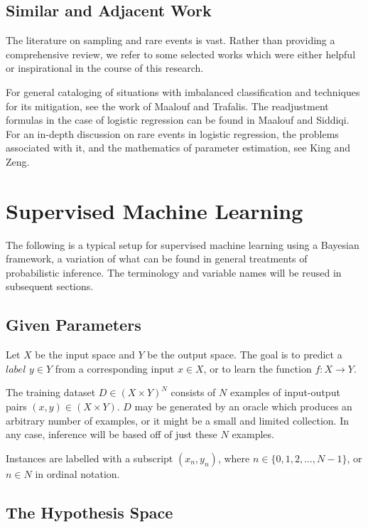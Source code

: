 \documentclass[twoside]{article}
\begin{document}
\subsection{Similar and Adjacent Work}

The literature on sampling and rare events is vast. Rather than providing a comprehensive review, we refer to some selected works which were either helpful or inspirational in the course of this research.

For general cataloging of situations with imbalanced classification and techniques for its mitigation, see the work of Maalouf and Trafalis\cite{rareevents}. The readjustment formulas in the case of logistic regression can be found in Maalouf and Siddiqi\cite{weightedlogistic}. For an in-depth discussion on rare events in logistic regression, the problems associated with it, and the mathematics of parameter estimation, see King and Zeng\cite{king}.

\section{Supervised Machine Learning} \label{framework}

The following is a typical setup for supervised machine learning using a Bayesian framework, a variation of what can be found in general treatments of probabilistic inference\cite{pythonbayes}\cite{gelmanbayes}\cite{blais}. The terminology and variable names will be reused in subsequent sections.

\subsection{Given Parameters}

Let \(X\) be the input space and \(Y\) be the output space. The goal is to predict a \(label\) \(y \in Y\) from a corresponding input \(x \in X\), or to learn the function \(f: X \to Y\).

The training dataset \(D \in (X \times Y)^N\) consists of \(N\) examples of input-output pairs \((x, y) \in (X \times Y) \). \(D\) may be generated by an oracle which produces an arbitrary number of examples, or it might be a small and limited collection. In any case, inference will be based off of just these \(N\) examples.

Instances are labelled with a subscript \((x_n, y_n)\), where \(n \in \{0, 1, 2,\ldots,N-1\}\), or \(n \in N\) in ordinal notation.

\subsection{The Hypothesis Space}
\end{document}
